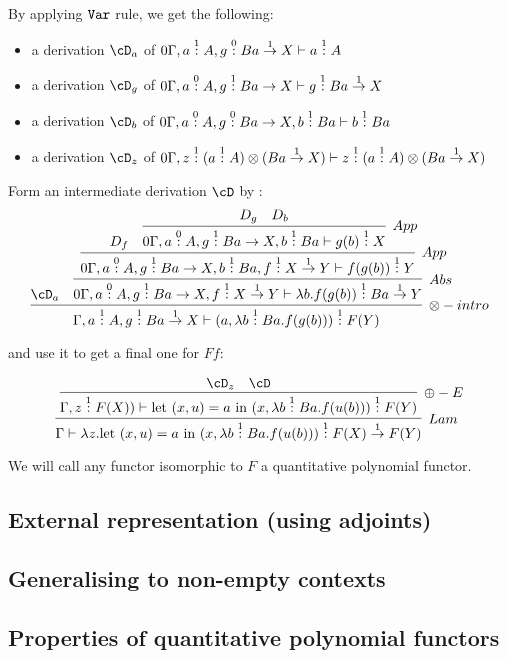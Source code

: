 \documentclass[12pt,a4paper]{article}
\begin{document}
By applying $\tt{Var}$ rule, we get the following:
\begin{itemize}
  \item a derivation $\cD_a$ of $0\Gamma, a \overset{1}{:} A, g \overset{0}{:} B a \overset{1}{\to} X \vdash a \overset{1}{:} A$ 
  \item a derivation $\cD_g$ of $0\Gamma, a \overset{0}{:} A, g \overset{1}{:} B a \to X \vdash g \overset{1}{:} B a \overset{1}{\to} X$
  \item a derivation $\cD_b$ of $0\Gamma, a \overset{0}{:} A, g \overset{0}{:} B a \to X, b \overset{1}{:} B a \vdash b \overset{1}{:} B a $ 
  \item a derivation $\cD_z$ of $0\Gamma, z \overset{1}{:} (a \overset{1}{:} A) \otimes (B a \overset{1}{\to} X) \vdash z \overset{1}{:} (a \overset{1}{:} A) \otimes (B a \overset{1}{\to} X)$
\end{itemize}
Form an intermediate derivation $\cD$ by : 
$$ 
\infer[\otimes-intro]{\Gamma, a \of{1} A, g \of{1} B a \overset{1}\to X \vdash (a, \lambda b \of{1} B a. f(g(b))) \of{1} F(Y)}{
  \cD_a
  &
  \infer[Abs]{0\Gamma, a \of{0} A, g \of{1} B a \to X, f \of{1} X \ofto{1} Y \vdash \lambda b .f(g(b)) \of{1} Ba \ofto{1} Y }{
    \infer[App]{0\Gamma, a \of{0} A, g \of{1} B a \to X, b \of{1} B a, f \of{1} X \ofto{1} Y \vdash f(g(b)) \of{1} Y }{
      D_f 
      &
      \infer[App]{0\Gamma, a \of{0} A, g \of{1} B a \to X, b \of{1} B a \vdash g(b) \of{1} X }{
        D_g & D_b
      }
    }
  }
}
$$

and use it to get a final one for $Ff$:

$$\infer[Lam]{\Gamma \vdash \lambda z.\text{let } (x,u) = a \text{ in } (x , \lambda b \of{1} Ba. f(u(b))) \of{1} F(X) \ofto{1} F(Y)}{
  \infer[\oplus-E]{\Gamma,  z \of{1} F(X)) \vdash \text{let } (x,u) = a \text{ in } (x , \lambda b \of{1} Ba. f(u(b))) \of{1} F(Y)}
  {
    \cD_z
    &
    \cD
  }
}
$$
\begin{definition}
  We will call any functor isomorphic to $F$ a quantitative polynomial functor.
\end{definition}
\subsection{External representation (using adjoints)}

\subsection{Generalising to non-empty contexts}
\subsection{Properties of quantitative polynomial functors}
\end{document}
